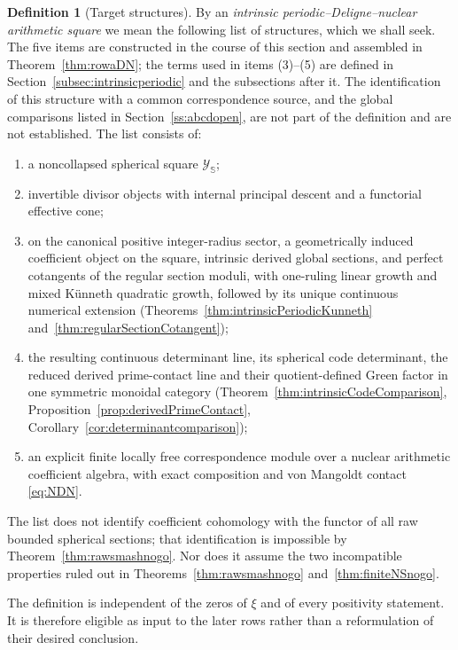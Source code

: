 \documentclass[11pt]{amsart}
\theoremstyle{definition}
\newtheorem{definition}[theorem]{Definition}
\theoremstyle{remark}
\begin{document}
\begin{definition}[Target structures]\label{def:strongrowa}
By an \emph{intrinsic periodic--Deligne--nuclear arithmetic square} we mean
the following list of structures, which we shall seek.  The five items are
constructed in the course of this section and assembled in
Theorem~\ref{thm:rowaDN}; the terms used in items (3)--(5) are defined in
Section~\ref{subsec:intrinsicperiodic} and the subsections after it. The
identification of this structure with a common correspondence source, and
the global comparisons listed in Section~\ref{ss:abcdopen}, are not part of
the definition and are not established.  The list consists of:
\begin{enumerate}
\item a noncollapsed spherical square $\mathscr Y_{\mathbb S}$;
\item invertible divisor objects with internal principal descent and a
functorial effective cone;
\item on the canonical positive integer-radius sector, a geometrically
induced coefficient object on the square, intrinsic derived global sections,
and perfect cotangents of the regular section moduli, with one-ruling linear
growth and mixed K\"unneth quadratic growth, followed by its unique
continuous numerical extension (Theorems~\ref{thm:intrinsicPeriodicKunneth}
and~\ref{thm:regularSectionCotangent});
\item the resulting continuous determinant line, its spherical code
determinant, the reduced derived prime-contact line and their
quotient-defined Green factor in one symmetric monoidal category
(Theorem~\ref{thm:intrinsicCodeComparison},
Proposition~\ref{prop:derivedPrimeContact},
Corollary~\ref{cor:determinantcomparison});
\item an explicit finite locally free correspondence module over a nuclear
arithmetic coefficient algebra, with exact composition and von Mangoldt
contact \eqref{eq:NDN}.
\end{enumerate}
The list does not identify coefficient cohomology
with the functor of all raw bounded spherical sections; that identification
is impossible by Theorem~\ref{thm:rawsmashnogo}.  Nor does it assume the
two incompatible properties ruled out in
Theorems~\ref{thm:rawsmashnogo} and~\ref{thm:finiteNSnogo}.
\end{definition}

The definition is independent of the zeros of $\xi$ and of every positivity
statement.  It is therefore eligible as input to the later rows rather than
a reformulation of their desired conclusion.
\end{document}
